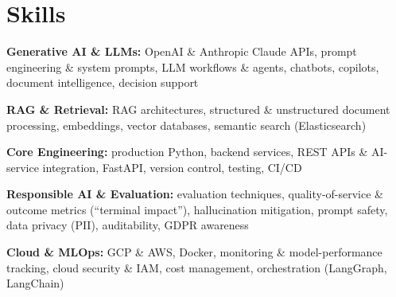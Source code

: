 \documentclass[10pt,a4paper]{article}
\begin{document}
\section{Skills}
\begin{tight}
  \item[\textcolor{accent}{\small$\bullet$}] \textbf{Generative AI \& LLMs:} OpenAI \& Anthropic Claude APIs, prompt engineering \& system prompts, LLM workflows \& agents, chatbots, copilots, document intelligence, decision support
  \item[\textcolor{accent}{\small$\bullet$}] \textbf{RAG \& Retrieval:} RAG architectures, structured \& unstructured document processing, embeddings, vector databases, semantic search (Elasticsearch)
  \item[\textcolor{accent}{\small$\bullet$}] \textbf{Core Engineering:} production Python, backend services, REST APIs \& AI-service integration, FastAPI, version control, testing, CI/CD
  \item[\textcolor{accent}{\small$\bullet$}] \textbf{Responsible AI \& Evaluation:} evaluation techniques, quality-of-service \& outcome metrics (``terminal impact''), hallucination mitigation, prompt safety, data privacy (PII), auditability, GDPR awareness
  \item[\textcolor{accent}{\small$\bullet$}] \textbf{Cloud \& MLOps:} GCP \& AWS, Docker, monitoring \& model-performance tracking, cloud security \& IAM, cost management, orchestration (LangGraph, LangChain)
\end{tight}

\end{document}
